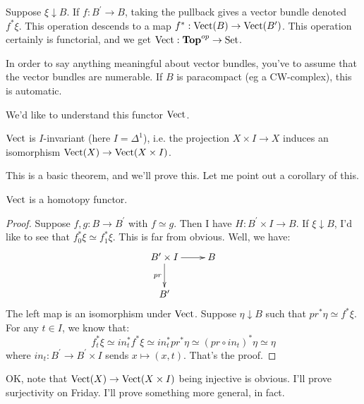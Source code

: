 Suppose $\xi\downarrow B$. If $f:B^\prime\to B$, taking the pullback gives a vector bundle denoted $f^\ast\xi$. This operation descends to a map $f^\ast:\operatorname{Vect}(B)\to \operatorname{Vect}(B^\prime)$. This operation certainly is functorial, and we get $\operatorname{Vect}:\mathbf{Top}^{op}\to \mathrm{Set}$.
\begin{warning}
In order to say anything meaningful about vector bundles, you've to assume that the vector bundles are numerable. If $B$ is paracompact (eg a CW-complex), this is automatic.
\end{warning}
We'd like to understand this functor $\operatorname{Vect}$.
\begin{theorem}
    $\operatorname{Vect}$ is $I$-invariant (here $I = \Delta^1$), i.e. the projection $X\times I\to X$ induces an isomorphism $\operatorname{Vect}(X)\to \operatorname{Vect}(X\times I)$.
\end{theorem}
This is a basic theorem, and we'll prove this. Let me point out a corollary of this.
\begin{corollary}
    $\operatorname{Vect}$ is a homotopy functor.
\end{corollary}
\begin{proof}
    Suppose $f,g:B\to B^\prime$ with $f\simeq g$. Then I have $H:B^\prime\times I\to B$. If $\xi\downarrow B$, I'd like to see that $f^\ast_0\xi\simeq f_1^\ast\xi$. This is far from obvious. Well, we have:
    \begin{equation*}
	\xymatrix{
	    B^\prime\times I\ar[r]\ar[d]_{pr} & B\\
	    B^\prime & 
	    }
    \end{equation*}
    The left map is an isomorphism under $\operatorname{Vect}$. Suppose $\eta\downarrow B$ such that $pr^\ast\eta \simeq f^\ast\xi$.
    For any $t\in I$, we know that:
    $$f_t^\ast\xi \simeq in_t^\ast f^\ast\xi \simeq in_t^\ast pr^\ast\eta \simeq (pr\circ in_t)^\ast\eta \simeq \eta$$
    where $in_t:B^\prime\to B^\prime\times I$ sends $x\mapsto(x,t)$. That's the proof.
\end{proof}
OK, note that $\operatorname{Vect}(X)\to \operatorname{Vect}(X\times I)$ being injective is obvious. I'll prove surjectivity on Friday. I'll prove something more general, in fact.
